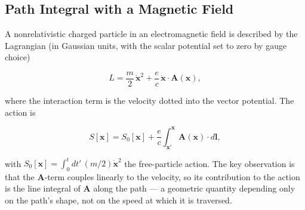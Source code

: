 \subsection{Path Integral with a Magnetic Field}

A nonrelativistic charged particle in an electromagnetic field is described by the Lagrangian (in Gaussian units, with the scalar potential set to zero by gauge choice)
\begin{linenomath}
\begin{equation*}
L = \frac{m}{2}\,\dot{\bm x}^2 + \frac{e}{c}\,\dot{\bm x}\cdot\bm A(\bm x),
\end{equation*}
\end{linenomath}
where the interaction term is the velocity dotted into the vector potential. The action is
\begin{linenomath}
\begin{equation*}
S[\bm x] = S_0[\bm x] + \frac{e}{c}\int_{\bm x'}^{\bm x} \bm A(\bm x)\cdot d\bm l,
\end{equation*}
\end{linenomath}
with $S_0[\bm x] = \int_0^t dt'\,(m/2)\dot{\bm x}^2$ the free-particle action. The key observation is that the $\bm A$-term couples linearly to the velocity, so its contribution to the action is the line integral of $\bm A$ along the path --- a geometric quantity depending only on the path's shape, not on the speed at which it is traversed.

